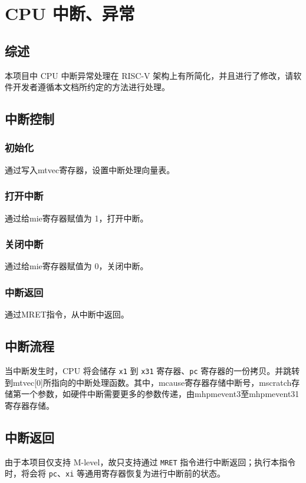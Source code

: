 
\chapter{CPU 中断、异常}

\section{综述}
本项目中 CPU 中断异常处理在 RISC-V 架构上有所简化，并且进行了修改，请软件开发者遵循本文档所约定的方法进行处理。

\section{中断控制}

\subsection{初始化}
通过写入mtvec寄存器，设置中断处理向量表。

\subsection{打开中断}
通过给mie寄存器赋值为 1，打开中断。

\subsection{关闭中断}
通过给mie寄存器赋值为 0，关闭中断。

\subsection{中断返回}
通过MRET指令，从中断中返回。

\section{中断流程}

当中断发生时，CPU 将会储存 \texttt{x1} 到 \texttt{x31} 寄存器、\texttt{pc} 寄存器的一份拷贝。并跳转到mtvec[0]所指向的中断处理函数。其中，mcause寄存器存储中断号，mscratch存储第一个参数，如硬件中断需要更多的参数传递，由mhpmevent3至mhpmevent31寄存器存储。

\section{中断返回}

由于本项目仅支持 M-level，故只支持通过 \texttt{MRET} 指令进行中断返回；执行本指令时，将会将 \texttt{pc}、\texttt{xi} 等通用寄存器恢复为进行中断前的状态。

